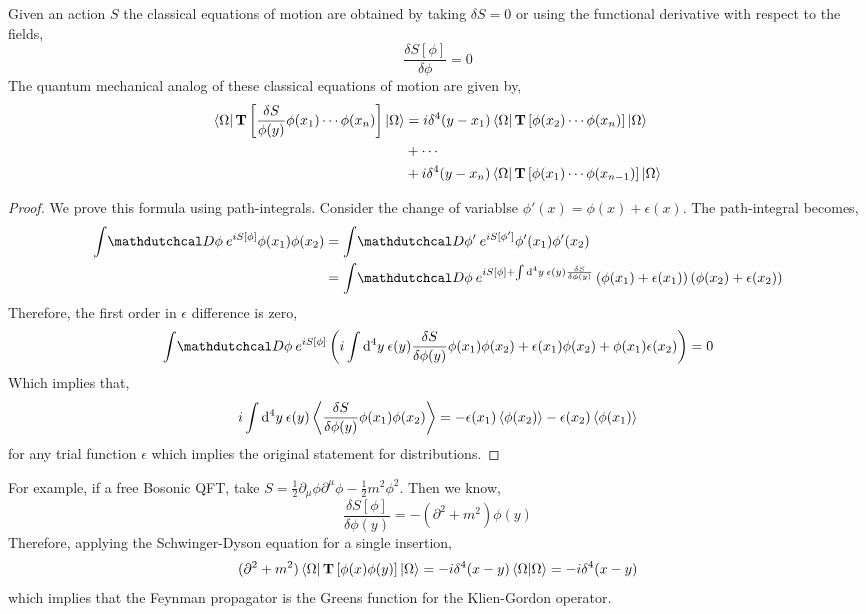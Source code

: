 \documentclass[12pt]{extarticle}
\begin{document}
Given an action $S$ the classical equations of motion are obtained by taking $\delta S = 0$ or using the functional derivative with respect to the fields,
\[ \frac{\delta S[\phi]}{\delta \phi} = 0 \]
The quantum mechanical analog of these classical equations of motion are given by,
\begin{align*}
\left< \Omega \right| \mathbf{T}\left[  \frac{\delta S}{\phi(y)} \phi(x_1) \cdots \phi(x_n) \right] \left| \Omega \right> & = i \delta^4(y - x_1) \left< \Omega \right| \mathbf{T}\left[ \phi(x_2) \cdots \phi(x_n) \right] \left| \Omega \right> 
\\
&  + \cdots
\\
& + i \delta^4(y - x_n) \left< \Omega \right| \mathbf{T}\left[ \phi(x_1) \cdots \phi(x_{n-1}) \right] \left| \Omega \right> 
\end{align*} 
\begin{proof}
We prove this formula using path-integrals. Consider the change of variablse $\phi'(x) = \phi(x) + \epsilon(x)$. The path-integral becomes,
\begin{align*}
\int \pathd{\phi} e^{i S[\phi]} \phi(x_1) \phi(x_2) &= \int \pathd{\phi'} e^{i S[\phi']} \phi'(x_1) \phi'(x_2) 
\\
&= \int \pathd{\phi} e^{i S[\phi] + \int \dn{4}{y} \epsilon(y) \frac{\delta S}{\delta \phi(y)}} \left( \phi(x_1) + \epsilon(x_1) \right) \left( \phi(x_2) + \epsilon(x_2) \right)
\end{align*}
Therefore, the first order in $\epsilon$ difference is zero,
\begin{align*}
\int \pathd{\phi} e^{i S[\phi]} \left( i \int \dn{4}{y} \epsilon(y) \frac{\delta S}{\delta \phi(y)} \phi(x_1) \phi(x_2) + \epsilon(x_1) \phi(x_2) + \phi(x_1) \epsilon(x_2) \right) = 0
\end{align*}
Which implies that,
\begin{align*}
i \int \mathrm{d}^{4} y \: \epsilon(y) \left<  \frac{\delta S}{\delta \phi(y)} \phi(x_1) \phi(x_2)  \right> = - \epsilon(x_1) \left< \phi(x_2) \right> - \epsilon(x_2) \left< \phi(x_1) \right> 
\end{align*}
for any trial function $\epsilon$ which implies the original statement for distributions. 
\end{proof}
For example, if a free Bosonic QFT, take $S = \tfrac{1}{2} \partial_\mu \phi \partial^\mu \phi - \tfrac{1}{2} m^2 \phi^2$. Then we know,
\[ \frac{\delta S[\phi]}{\delta \phi(y)} = - (\partial^2 + m^2) \phi(y) \]
Therefore, applying the Schwinger-Dyson equation for a single insertion,
\[ (\partial^2 + m^2) \left< \Omega \right| \mathbf{T}\left[  \phi(x) \phi(y)  \right] \left| \Omega \right> = - i \delta^4(x - y) \left< \Omega | \Omega \right> = - i \delta^4(x - y) \]
which implies that the Feynman propagator is the Greens function for the Klien-Gordon operator.  
\end{document}
